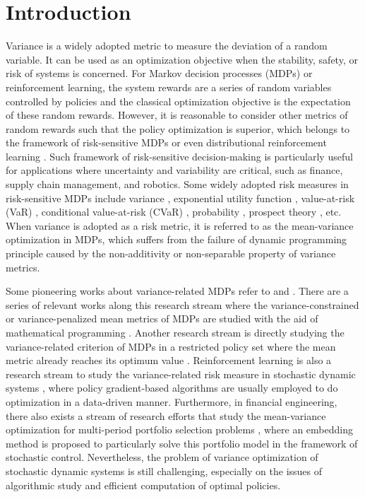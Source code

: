 \documentclass[12pt]{article}
\begin{document}
\section{Introduction}\label{section_intro}

Variance is a widely adopted metric to measure the deviation of a
random variable. It can be used as an optimization objective when
the stability, safety, or risk of systems is concerned. For Markov
decision processes (MDPs) or reinforcement learning, the system
rewards are a series of random variables controlled by policies and
the classical optimization objective is the expectation of these
random rewards. However, it is reasonable to consider other metrics
of random rewards such that the policy optimization is superior,
which belongs to the framework of risk-sensitive MDPs or even
distributional reinforcement learning \citep{Bellemare23}. Such
framework of risk-sensitive decision-making is particularly useful
for applications where uncertainty and variability are critical,
such as finance, supply chain management, and robotics. Some widely
adopted risk measures in risk-sensitive MDPs include variance
\citep{Sobel82,Xia20}, exponential utility function
\citep{Howard1972,Borkar02,Cavazos-Cadena23,Blancas-Rivera24},
value-at-risk (VaR) \citep{Li2022}, conditional value-at-risk (CVaR)
\citep{Bauerle2011,Xia2023}, probability \citep{White93,Wen24},
prospect theory \citep{Etesami18,Wu24}, etc. When variance is
adopted as a risk metric, it is referred to as the mean-variance
optimization in MDPs, which suffers from the failure of dynamic
programming principle caused by the non-additivity or non-separable
property of variance metrics.


Some pioneering works about variance-related MDPs refer to
\cite{Sobel82} and \cite{Filar89}. There are a series of relevant
works along this research stream where the variance-constrained or
variance-penalized mean metrics of MDPs are studied with the aid of
mathematical programming \citep{White92,Chung94,Sobel94,Borkar24}.
Another research stream is directly studying the variance-related
criterion of MDPs in a restricted policy set where the mean metric
already reaches its optimum value
\citep{Hernandez99,Guo09b,Huang18,Xia18a}. Reinforcement learning is
also a research stream to study the variance-related risk measure in
stochastic dynamic systems \citep{Tamar12,Prashanth13,Bisi20}, where
policy gradient-based algorithms are usually employed to do
optimization in a data-driven manner. Furthermore, in financial
engineering, there also exists a stream of research efforts that
study the mean-variance optimization for multi-period portfolio
selection problems \citep{Li00,Zhou00,Zhou04}, where an embedding
method is proposed to particularly solve this portfolio model in the
framework of stochastic control. Nevertheless, the problem of
variance optimization of stochastic dynamic systems is still
challenging, especially on the issues of algorithmic study and
efficient computation of optimal policies.
\end{document}
